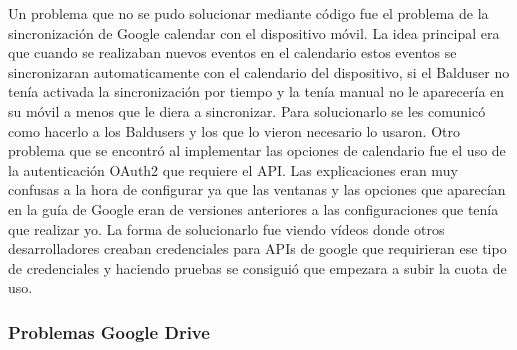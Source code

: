 Un problema que no se pudo solucionar mediante código fue el problema de la sincronización de Google calendar con el dispositivo móvil. La idea principal era que cuando se realizaban nuevos eventos en el calendario estos eventos se sincronizaran automaticamente con el calendario del dispositivo, si el Balduser no tenía activada la sincronización por tiempo y la tenía manual no le aparecería en su móvil a menos que le diera a sincronizar.
Para solucionarlo se les comunicó como hacerlo a los Baldusers y los que lo vieron necesario lo usaron.
Otro problema que se encontró al implementar las opciones de calendario fue el uso de la autenticación OAuth2 que requiere el API.
Las explicaciones eran muy confusas a la hora de configurar ya que las ventanas y las opciones que aparecían en la guía de Google eran de versiones anteriores a las configuraciones que tenía que realizar yo.
La forma de solucionarlo fue viendo vídeos donde otros desarrolladores creaban credenciales para APIs de google que requirieran ese tipo de credenciales y haciendo pruebas se consiguió que empezara a subir la cuota de uso.


\subsubsection{Problemas Google Drive}
\label{subsubsecc:Problemas Google Drive}

